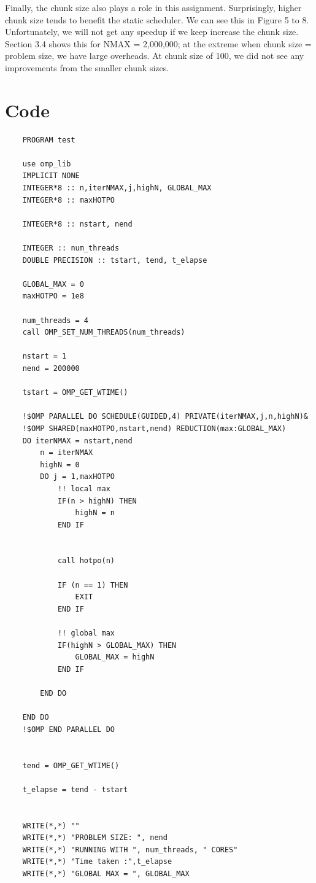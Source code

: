 \documentclass[12pt]{article}
\begin{document}
        \noindent
        Finally, the chunk size also plays a role in this assignment.  Surprisingly, higher chunk size tends to benefit the static scheduler.  We can see this in Figure 5 to 8. Unfortunately, we will not get any speedup if we keep increase the chunk size. Section 3.4 shows this for NMAX = 2,000,000; at the extreme when chunk size = problem size, we have large overheads.  At chunk size of 100, we did not see any improvements from the smaller chunk sizes. 

        \newpage
        \section{Code}

        \begin{lstlisting}
    PROGRAM test

    use omp_lib 
    IMPLICIT NONE
    INTEGER*8 :: n,iterNMAX,j,highN, GLOBAL_MAX 
    INTEGER*8 :: maxHOTPO 

    INTEGER*8 :: nstart, nend 

    INTEGER :: num_threads 
    DOUBLE PRECISION :: tstart, tend, t_elapse
    
    GLOBAL_MAX = 0 
    maxHOTPO = 1e8

    num_threads = 4 
    call OMP_SET_NUM_THREADS(num_threads)

    nstart = 1
    nend = 200000 

    tstart = OMP_GET_WTIME()

    !$OMP PARALLEL DO SCHEDULE(GUIDED,4) PRIVATE(iterNMAX,j,n,highN)&
    !$OMP SHARED(maxHOTPO,nstart,nend) REDUCTION(max:GLOBAL_MAX) 
    DO iterNMAX = nstart,nend
        n = iterNMAX
        highN = 0
        DO j = 1,maxHOTPO        
            !! local max 
            IF(n > highN) THEN 
                highN = n 
            END IF 

            
            call hotpo(n)

            IF (n == 1) THEN 
                EXIT 
            END IF

            !! global max 
            IF(highN > GLOBAL_MAX) THEN 
                GLOBAL_MAX = highN
            END IF

        END DO 

    END DO
    !$OMP END PARALLEL DO 
    

    tend = OMP_GET_WTIME() 

    t_elapse = tend - tstart 


    WRITE(*,*) ""
    WRITE(*,*) "PROBLEM SIZE: ", nend
    WRITE(*,*) "RUNNING WITH ", num_threads, " CORES"
    WRITE(*,*) "Time taken :",t_elapse  
    WRITE(*,*) "GLOBAL MAX = ", GLOBAL_MAX




\end{lstlisting}
\end{document}
